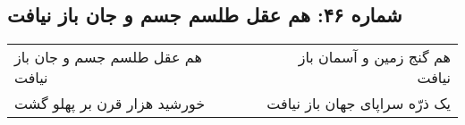 \begin{center}
\section*{شماره ۴۶: هم عقل طلسم جسم و جان باز نیافت}
\label{sec:046}
\begin{longtable}{l p{0.5cm} r}
هم عقل طلسم جسم و جان باز نیافت
&&
هم گنج زمین و آسمان باز نیافت
\\
خورشید هزار قرن بر پهلو گشت
&&
یک ذرّه سراپای جهان باز نیافت
\\
\end{longtable}
\end{center}
